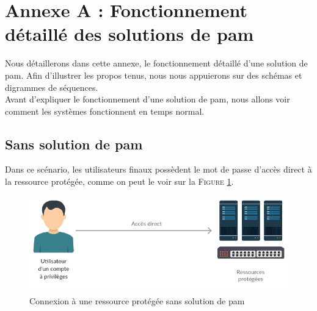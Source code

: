 \setcounter{section}{1}


\section*{Annexe A : Fonctionnement détaillé des solutions de \gls{pam}}
\label{annexe:A}

Nous détaillerons dans cette annexe, le fonctionnement détaillé d'une solution de \gls{pam}. Afin d'illustrer les propos tenus, nous nous appuierons sur des schémas et digrammes de séquences.\\
Avant d'expliquer le fonctionnement d'une solution de \gls{pam}, nous allons voir comment les systèmes fonctionnent en temps normal.

\subsection{Sans solution de \gls{pam}}
\label{par:nopam}

Dans ce scénario, les utilisateurs finaux possèdent le mot de passe d'accès direct à la ressource protégée, comme on peut le voir sur la \textsc{Figure} \ref{fig:sans_PAM}.

\begin{figure}[!ht]
    \center
    \includegraphics[width=\textwidth]{./images/Schema_ultra_light_sans_PAM.png}
    \caption{Connexion à une ressource protégée sans solution de \gls{pam}}
    \label{fig:sans_PAM}
\end{figure}

